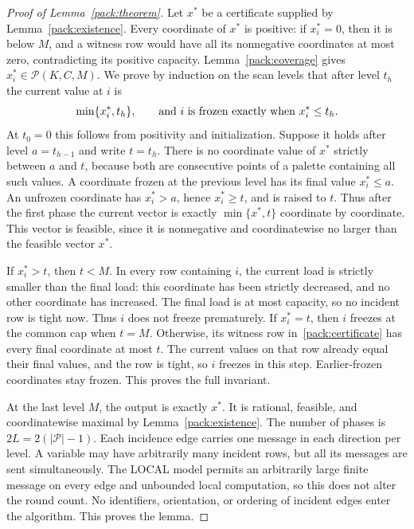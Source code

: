 \documentclass[11pt,a4paper]{article}
\theoremstyle{definition}
\theoremstyle{remark}
\begin{document}
\begin{proof}[Proof of Lemma~\ref{pack:theorem}]
Let $x^*$ be a certificate supplied by Lemma~\ref{pack:existence}.
Every coordinate of $x^*$ is positive: if $x^*_i=0$, then it is below
$M$, and a witness row would have all its nonnegative coordinates at
most zero, contradicting its positive capacity.
Lemma~\ref{pack:coverage} gives $x^*_i\in\mathcal P(K,C,M)$.
We prove by induction on the scan levels that after level $t_h$ the
current value at $i$ is
\begin{equation}\label{pack:scan-invariant}
 \min\{x^*_i,t_h\},
 \qquad\hbox{and $i$ is frozen exactly when }x^*_i\leq t_h.
\end{equation}
At $t_0=0$ this follows from positivity and initialization.
Suppose it holds after level $a=t_{h-1}$ and write $t=t_h$.
There is no coordinate value of $x^*$ strictly between $a$ and $t$,
because both are consecutive points of a palette containing all such
values.  A coordinate frozen at the previous level has its final value
$x^*_i\leq a$.  An unfrozen coordinate has $x^*_i>a$, hence
$x^*_i\geq t$, and is raised to $t$.  Thus after the first phase
the current vector is exactly $\min\{x^*,t\}$ coordinate by coordinate.
This vector is feasible, since it is nonnegative and coordinatewise no
larger than the feasible vector $x^*$.

If $x^*_i>t$, then $t<M$.  In every row containing $i$, the current
load is strictly smaller than the final load: this coordinate has been
strictly decreased, and no other coordinate has increased.  The final
load is at most capacity, so no incident row is tight now.  Thus $i$
does not freeze prematurely.
If $x^*_i=t$, then $i$ freezes at the common cap when $t=M$.
Otherwise, its witness row in~\eqref{pack:certificate} has every final
coordinate at most $t$.  The current values on that row already equal
their final values, and the row is tight, so $i$ freezes in this step.
Earlier-frozen coordinates stay frozen.  This proves the full invariant.

At the last level $M$, the output is exactly $x^*$.  It is rational,
feasible, and coordinatewise maximal by Lemma~\ref{pack:existence}.
The number of phases is $2L=2(|\mathcal P|-1)$.  Each incidence edge
carries one message in each direction per level.  A variable may have
arbitrarily many incident rows, but all its messages are sent
simultaneously.  The LOCAL model permits an arbitrarily large finite
message on every edge and unbounded local computation, so this does not
alter the round count.  No identifiers, orientation, or ordering of
incident edges enter the algorithm.  This proves the lemma.
\end{proof}
\end{document}
